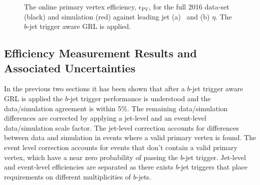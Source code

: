 \begin{figure}[!ht]
  \begin{center}
    \captionsetup[subfigure]{aboveskip=0pt,justification=centering}
  \end{center}
\vspace{-1em}
\caption[
  The online primary vertex efficiency for the full 2016 data-set and for simulation.
  The $b$-jet trigger aware GRL is applied.
]
        {
  The online primary vertex efficiency, $\epsilon_{\text{PV}}$, for the full 2016 data-set (black) and simulation (red) against leading jet (a) \pT~and (b) $\eta$.
  The $b$-jet trigger aware GRL is applied.}
  \label{fig:Full_bslt2mm_bperf}
\end{figure}

\clearpage
\subsection{Efficiency Measurement Results and Associated Uncertainties}
\label{sec:trig-eff_syst}

In the previous two sections it has been shown that after a $b$-jet trigger aware GRL is applied
the $b$-jet trigger performance is understood and the data/simulation agreement is within 5\%.
The remaining data/simulation differences are corrected by applying a jet-level and an event-level data/simulation scale factor.
The jet-level correction accounts for differences between data and simulation in events where a valid primary vertex is found.
The event level correction accounts for events that don't contain a valid primary vertex, which have a near zero probability of passing the $b$-jet trigger.
Jet-level and event-level efficiencies are separated as there exists $b$-jet triggers that place requirements on different multiplicities of $b$-jets.


